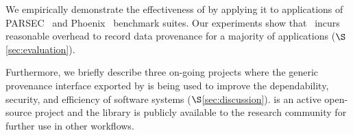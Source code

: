 We  empirically demonstrate  the effectiveness of \projecttitle by applying it to applications of  PARSEC~\cite{parsec} and Phoenix~\cite{phoenix} benchmark suites. Our experiments show that \projecttitle~incurs reasonable overhead to record data provenance for a majority of applications ($\S$\ref{sec:evaluation}). 

Furthermore, we briefly describe three on-going projects where the generic provenance interface exported by \projecttitle is being used to improve the dependability, security, and efficiency of software systems  ($\S$\ref{sec:discussion}). \projecttitle is an active open-source project and the library is publicly available to the research community for further use in other workflows.  

